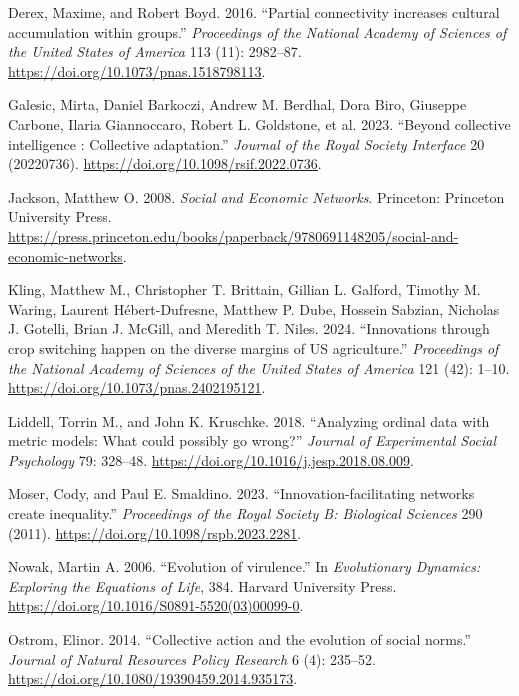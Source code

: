 \documentclass[
]{article}
\newlength{\cslhangindent}
\newenvironment{CSLReferences}[2] %
 {\begin{list}{}{%
  \setlength{\itemindent}{0pt}
  \setlength{\leftmargin}{0pt}
  \setlength{\parsep}{0pt}
  \ifodd #1
   \setlength{\leftmargin}{\cslhangindent}
   \setlength{\itemindent}{-1\cslhangindent}
  \fi
  \setlength{\itemsep}{#2\baselineskip}}}
 {\end{list}}
\begin{document}
\begin{CSLReferences}{1}{0}
Derex, Maxime, and Robert Boyd. 2016. {``{Partial connectivity increases
cultural accumulation within groups}.''} \emph{Proceedings of the
National Academy of Sciences of the United States of America} 113 (11):
2982--87. \url{https://doi.org/10.1073/pnas.1518798113}.

Galesic, Mirta, Daniel Barkoczi, Andrew M. Berdhal, Dora Biro, Giuseppe
Carbone, Ilaria Giannoccaro, Robert L. Goldstone, et al. 2023.
{``{Beyond collective intelligence : Collective adaptation}.''}
\emph{Journal of the Royal Society Interface} 20 (20220736).
\url{https://doi.org/10.1098/rsif.2022.0736}.

Jackson, Matthew O. 2008. \emph{{Social and Economic Networks}}.
Princeton: Princeton University Press.
\url{https://press.princeton.edu/books/paperback/9780691148205/social-and-economic-networks}.

Kling, Matthew M., Christopher T. Brittain, Gillian L. Galford, Timothy
M. Waring, Laurent Hébert-Dufresne, Matthew P. Dube, Hossein Sabzian,
Nicholas J. Gotelli, Brian J. McGill, and Meredith T. Niles. 2024.
{``{Innovations through crop switching happen on the diverse margins of
US agriculture}.''} \emph{Proceedings of the National Academy of
Sciences of the United States of America} 121 (42): 1--10.
\url{https://doi.org/10.1073/pnas.2402195121}.

Liddell, Torrin M., and John K. Kruschke. 2018. {``{Analyzing ordinal
data with metric models: What could possibly go wrong?}''} \emph{Journal
of Experimental Social Psychology} 79: 328--48.
\url{https://doi.org/10.1016/j.jesp.2018.08.009}.

Moser, Cody, and Paul E. Smaldino. 2023. {``{Innovation-facilitating
networks create inequality}.''} \emph{Proceedings of the Royal Society
B: Biological Sciences} 290 (2011).
\url{https://doi.org/10.1098/rspb.2023.2281}.

Nowak, Martin A. 2006. {``{Evolution of virulence}.''} In
\emph{Evolutionary Dynamics: Exploring the Equations of Life}, 384.
Harvard University Press.
\url{https://doi.org/10.1016/S0891-5520(03)00099-0}.

Ostrom, Elinor. 2014. {``{Collective action and the evolution of social
norms}.''} \emph{Journal of Natural Resources Policy Research} 6 (4):
235--52. \url{https://doi.org/10.1080/19390459.2014.935173}.


\end{CSLReferences}
\end{document}
